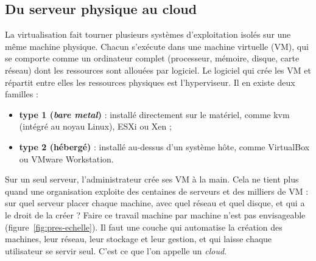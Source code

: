 \subsection{Du serveur physique au cloud}\label{sec:pres-cloud}

La virtualisation fait tourner plusieurs systèmes d'exploitation isolés sur une même machine physique. Chacun s'exécute dans une
machine virtuelle (VM), qui se comporte comme un ordinateur complet (processeur, mémoire, disque, carte réseau) dont les
ressources sont allouées par logiciel. Le logiciel qui crée les VM et répartit entre elles les ressources physiques est
l'\gls{hyperviseur}. Il en existe deux familles :

\begin{itemize}
  \item \textbf{type 1 (\emph{bare metal})} : installé directement sur le matériel, comme \gls{kvm} (intégré au noyau Linux), ESXi ou
        Xen ;
  \item \textbf{type 2 (hébergé)} : installé au-dessus d'un système hôte, comme VirtualBox ou VMware Workstation.
\end{itemize}

Sur un seul serveur, l'administrateur crée ses VM à la main. Cela ne tient plus quand une organisation exploite des centaines de
serveurs et des milliers de VM : sur quel serveur placer chaque machine, avec quel réseau et quel disque, et qui a le droit de la
créer ? Faire ce travail machine par machine n'est pas envisageable (figure~\ref{fig:pres-echelle}). Il faut une couche qui
automatise la création des machines, leur réseau, leur stockage et leur gestion, et qui laisse chaque utilisateur se servir seul.
C'est ce que l'on appelle un \emph{cloud}.

